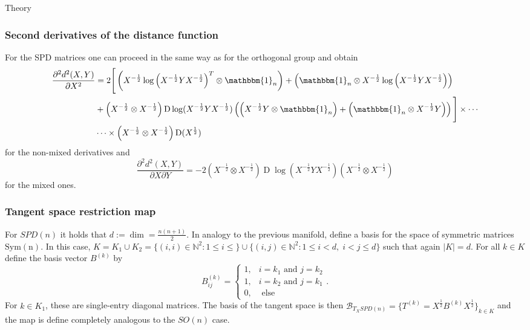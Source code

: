 \begin{chapter}{Theory}
\subsubsection{Second derivatives of the distance function} %
\label{ssub:SecondDerSPD}
For the SPD matrices one can proceed in the same way as for the orthogonal group and obtain
\begin{align}
    \label{eq:spd_xx_der}
    \frac{\partial^2 d^2(X,Y)}{\partial X^2} &= 
    2\Bigg[
	\left(X^{-\frac{1}{2}}\log\left(X^{-\frac{1}{2}}YX^{-\frac{1}{2}}\right)^T\otimes\mathbbm{1}_n\right)
	+\left(\mathbbm{1}_n\otimes X^{-\frac{1}{2}}\log\left(X^{-\frac{1}{2}}YX^{-\frac{1}{2}}\right)\right) \\
    &	+\left(X^{-\frac{1}{2}}\otimes X^{-\frac{1}{2}}\right)\operatorname{D}\log(X^{-\frac{1}{2}}YX^{-\frac{1}{2}})\left( \left(X^{-\frac{1}{2}}Y\otimes\mathbbm{1}_n\right)
	+ \left(\mathbbm{1}_n\otimes X^{-\frac{1}{2}}Y\right)\right) 
    \Bigg] \times\cdots \nonumber \\
    & \cdots\times\left(X^{-\frac{1}{2}}\otimes X^{-\frac{1}{2}}\right)\operatorname{D}(X^{\frac{1}{2}})\nonumber
\end{align}
for the non-mixed derivatives and
\begin{equation}
    \label{eq:spd_xy_der}
    \frac{\partial^2 d^2(X,Y)}{\partial X\partial Y} = -2\left(X^{-\frac{1}{2}}\otimes X^{-\frac{1}{2}}\right)\operatorname{D}\log\left(X^{-\frac{1}{2}}Y X^{-\frac{1}{2}}\right)\left(X^{-\frac{1}{2}}\otimes X^{-\frac{1}{2}}\right)
\end{equation}
for the mixed ones.

\subsubsection{Tangent space restriction map} %
\label{ssub:TangentSPD}
For $SPD(n)$ it holds that $d:=\operatorname{dim}=\frac{n(n+1)}{2}$. In analogy to the previous manifold, define a basis for the space of symmetric matrices 
$\operatorname{Sym(n)}$. In this case, $K= K_1\cup K_2=\lbrace (i,i)\in\mathbb{N}^2: 1\leq i\leq\rbrace \cup \lbrace (i,j)\in\mathbb{N}^2: 1\leq i < d,\; i < j \leq d  \rbrace$
such that again $|K|=d$. For all $k\in K$ define the basis vector $B^{(k)}$ by 
\begin{equation}
    B^{(k)}_{ij}=\begin{cases}
	1, & i=k_1 \text{ and } j=k_2\\
	1, & i=k_2 \text{ and } j=k_1\\
	0, & \text{ else }
    \end{cases}.
\end{equation}
For $k\in K_1$, these are single-entry diagonal matrices.
The basis of the tangent space is then $\mathcal{B}_{T_XSPD(n)}=\lbrace T^{(k)} = X^{\frac{1}{2}}B^{(k)}X^{\frac{1}{2}} \rbrace_{k\in K}$ and the
map is define completely analogous to the $SO(n)$ case.


\end{chapter}
